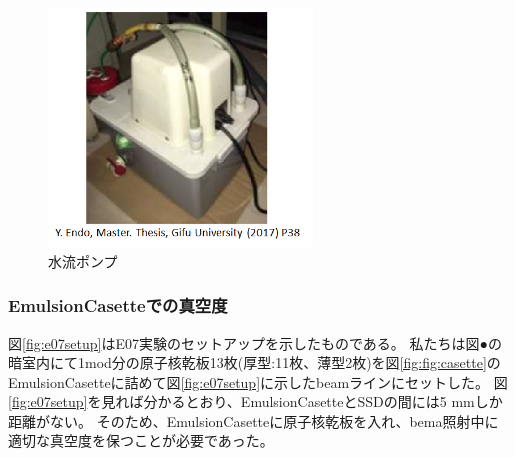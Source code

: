 \documentclass[12pt,a4paper]{jarticle}
\begin{document}
\begin{figure}[htbp]
  \centering
    \includegraphics[width=70mm]{ponpu.png}
  \caption{水流ポンプ\label{fig:ponpu}}
\end{figure}
\newpage
\subsubsection{EmulsionCasetteでの真空度}
図\ref{fig:e07setup}はE07実験のセットアップを示したものである。
私たちは図●の暗室内にて1mod分の原子核乾板13枚(厚型:11枚、薄型2枚)を図\ref{fig:fig:casette}のEmulsionCasetteに詰めて図\ref{fig:e07setup}に示したbeamラインにセットした。
図\ref{fig:e07setup}を見れば分かるとおり、EmulsionCasetteとSSDの間には5 mmしか距離がない。
そのため、EmulsionCasetteに原子核乾板を入れ、bema照射中に適切な真空度を保つことが必要であった。
\end{document}
